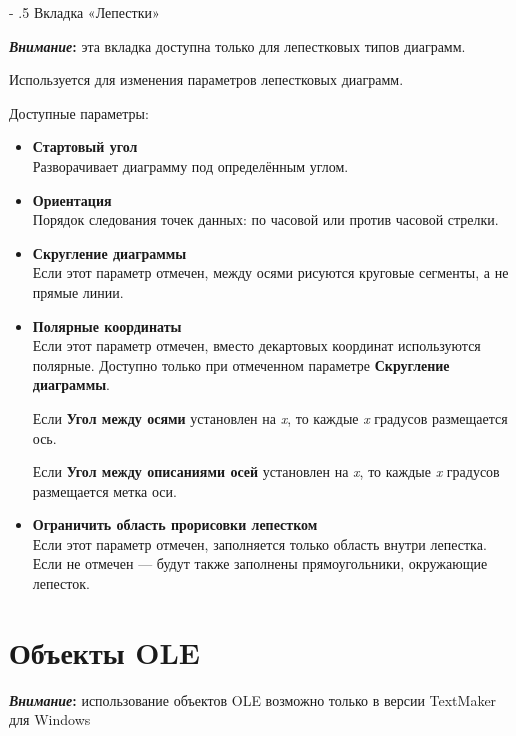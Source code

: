 \documentclass[a4paper,10pt]{article}
\makeatletter
\renewcommand\paragraph{%
   \@startsection{paragraph}{4}{0mm}%
      {-\baselineskip}%
      {.5\baselineskip}%
      {\normalfont\normalsize\bfseries}}
\makeatother
\begin{document}
\paragraph{Вкладка «Лепестки»}
\begin{mdframed}[backgroundcolor=blue!10]
\textbf{\textit{Внимание}:}  эта вкладка доступна только для лепестковых типов диаграмм.
\end{mdframed}

Используется для изменения параметров лепестковых диаграмм.

Доступные параметры:
\begin{itemize}
 \item \textbf{Стартовый угол}\\
 Разворачивает диаграмму под определённым углом.
 \item \textbf{Ориентация}\\
 Порядок следования точек данных: по часовой или против часовой стрелки.
 \item \textbf{Скругление диаграммы}\\
 Если этот параметр отмечен, между осями рисуются круговые сегменты, а не прямые линии.
 \item \textbf{Полярные координаты}\\
 Если этот параметр отмечен, вместо декартовых координат используются полярные. Доступно только при отмеченном параметре \textbf{Скругление диаграммы}.
 
 Если \textbf{Угол между осями} установлен на \textit{x}, то каждые \textit{x} градусов размещается ось.
 
 Если \textbf{Угол между описаниями осей} установлен на \textit{x}, то каждые \textit{x} градусов размещается метка оси.
 \item \textbf{Ограничить область прорисовки лепестком}\\
 Если этот параметр отмечен, заполняется только область внутри лепестка. Если не отмечен --- будут также заполнены прямоугольники, окружающие лепесток. 
\end{itemize}

\section{Объекты OLE}
\begin{mdframed}[backgroundcolor=blue!10]
\textbf{\textit{Внимание}:} использование объектов OLE возможно только в версии TextMaker для Windows
\end{mdframed}
\end{document}

